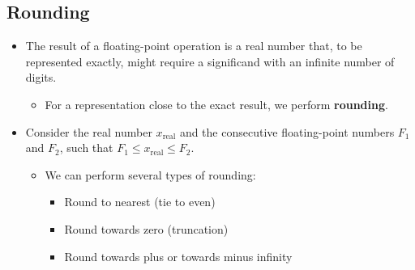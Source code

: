 \documentclass[12pt,openany, tikz,border=10pt]{book}
\begin{document}
			      	\subsection{Rounding}
			      	\begin{itemize}
			      		\item[] The result of a floating-point operation is a real number that, to be represented exactly, might require a significand with an infinite number of digits.
			      		      \begin{itemize}
			      		      	\item[] For a representation close to the exact result, we perform \textbf{rounding}.
			      		      \end{itemize}
			      		\item[] Consider the real number \( x_{\text{real}} \) and the consecutive floating-point numbers \( F_1 \) and \( F_2 \), such that \( F_1 \leq x_{\text{real}} \leq F_2 \).
			      		      \begin{itemize}
			      		      	\item[] We can perform several types of rounding:
			      		      	      \begin{itemize}
			      		      	      	\item[] Round to nearest (tie to even)
			      		      	      	\item[] Round towards zero (truncation)
			      		      	      	\item[] Round towards plus or towards minus infinity
			      		      	      \end{itemize}
			      		      \end{itemize}
			      	\end{itemize}
\end{document}
